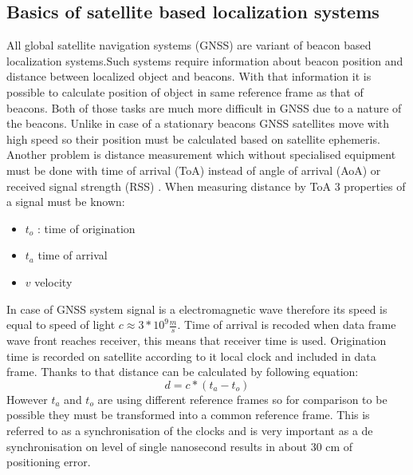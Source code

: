 \documentclass{kybernetika}
\begin{document}
\subsection{Basics of satellite based localization systems}
All global satellite navigation systems (GNSS) are variant of beacon based localization
systems\cite{Blewitt1997}.Such systems require information about beacon position
and distance between localized object and beacons.
With that information it is possible to calculate position of object in same reference
frame as that of beacons.
Both of those tasks are much more difficult in GNSS due to a nature of the beacons.
Unlike in case of a stationary beacons GNSS satellites move with high speed so
their position must be calculated based on satellite ephemeris\cite{Vallado2008}.
Another problem is distance measurement which without specialised equipment must be
done with time of arrival (ToA) instead of angle of arrival (AoA) or
received signal strength (RSS) \cite{Doberstein2012}.
When measuring distance by ToA  3 properties of a signal must be known:
\begin{itemize}
\item $t_o$ : time of origination
\item $t_a$ time of arrival
\item $v$ velocity
\end{itemize}
In case of GNSS system signal is a electromagnetic wave therefore its speed is equal
to speed of light $c\approx 3*10^{9} \frac{m}{s}$. Time of arrival is recoded when
data frame wave front reaches receiver, this means that receiver time is used.
Origination time is recorded on satellite according to it local clock and
included in data frame. Thanks to that distance can be calculated by following 
equation:
\begin{equation}
  d=c*(t_a-t_o)
\end{equation}
However $t_a$ and $t_o$ are using different reference frames so for comparison
to be possible they must be transformed into a common reference frame.
This is referred to as a synchronisation of the clocks and is very important as
a de synchronisation on level of single nanosecond results in about 30 cm of
positioning error\cite{Enge2011}.

\end{document}
